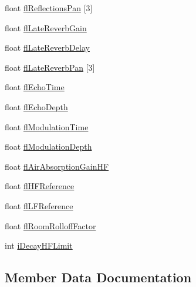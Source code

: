\begin{DoxyCompactItemize}
float \hyperlink{struct_e_f_x_e_a_x_r_e_v_e_r_b_p_r_o_p_e_r_t_i_e_s_a1e98ae2dcbd5cb25c6784b5f1181dbb1}{fl\+Reflections\+Pan} \mbox{[}3\mbox{]}
\item 
float \hyperlink{struct_e_f_x_e_a_x_r_e_v_e_r_b_p_r_o_p_e_r_t_i_e_s_ac32101bd6ea23d41a39100d1036a4acf}{fl\+Late\+Reverb\+Gain}
\item 
float \hyperlink{struct_e_f_x_e_a_x_r_e_v_e_r_b_p_r_o_p_e_r_t_i_e_s_a45c5f6a516e4ffd08ccd6bd35a15b3c2}{fl\+Late\+Reverb\+Delay}
\item 
float \hyperlink{struct_e_f_x_e_a_x_r_e_v_e_r_b_p_r_o_p_e_r_t_i_e_s_ae8a3cba02be4a6e4af41c551b1856c84}{fl\+Late\+Reverb\+Pan} \mbox{[}3\mbox{]}
\item 
float \hyperlink{struct_e_f_x_e_a_x_r_e_v_e_r_b_p_r_o_p_e_r_t_i_e_s_aa1ad488819884fe0ca9a6ac3cb4ab581}{fl\+Echo\+Time}
\item 
float \hyperlink{struct_e_f_x_e_a_x_r_e_v_e_r_b_p_r_o_p_e_r_t_i_e_s_ae1b2a5691ad36203427b70856158f50f}{fl\+Echo\+Depth}
\item 
float \hyperlink{struct_e_f_x_e_a_x_r_e_v_e_r_b_p_r_o_p_e_r_t_i_e_s_a607ea8692513389b603e9851fb9f14dc}{fl\+Modulation\+Time}
\item 
float \hyperlink{struct_e_f_x_e_a_x_r_e_v_e_r_b_p_r_o_p_e_r_t_i_e_s_ab3d44b53ddcc1e6d295b89e8fa28a8af}{fl\+Modulation\+Depth}
\item 
float \hyperlink{struct_e_f_x_e_a_x_r_e_v_e_r_b_p_r_o_p_e_r_t_i_e_s_a80c8ad56521d0918975aaba19edcd1be}{fl\+Air\+Absorption\+Gain\+HF}
\item 
float \hyperlink{struct_e_f_x_e_a_x_r_e_v_e_r_b_p_r_o_p_e_r_t_i_e_s_af42ea95461db17e0b73b0a4decf720c3}{fl\+H\+F\+Reference}
\item 
float \hyperlink{struct_e_f_x_e_a_x_r_e_v_e_r_b_p_r_o_p_e_r_t_i_e_s_a9d7409aeb14b972f77fd83643d7ecfaa}{fl\+L\+F\+Reference}
\item 
float \hyperlink{struct_e_f_x_e_a_x_r_e_v_e_r_b_p_r_o_p_e_r_t_i_e_s_addd42aea886c8930594cf15f91fb8bec}{fl\+Room\+Rolloff\+Factor}
\item 
int \hyperlink{struct_e_f_x_e_a_x_r_e_v_e_r_b_p_r_o_p_e_r_t_i_e_s_a454d6bbeaeaf108414712439d36679ff}{i\+Decay\+H\+F\+Limit}
\end{DoxyCompactItemize}


\subsection{Member Data Documentation}
\mbox{\label{struct_e_f_x_e_a_x_r_e_v_e_r_b_p_r_o_p_e_r_t_i_e_s_a80c8ad56521d0918975aaba19edcd1be}} 
